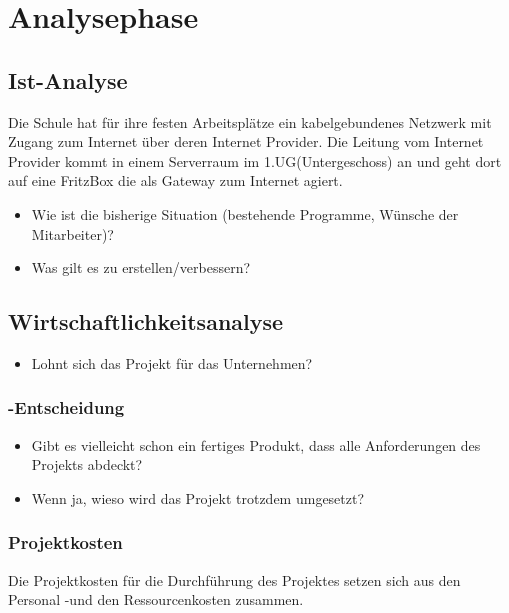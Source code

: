 \section{Analysephase} 
\label{sec:Analysephase}


\subsection{Ist-Analyse} 
\label{sec:IstAnalyse}
Die Schule hat für ihre festen Arbeitsplätze ein kabelgebundenes Netzwerk mit Zugang zum Internet über deren Internet Provider. 
Die Leitung vom Internet Provider kommt in einem Serverraum im 1.UG(Untergeschoss) an und geht dort auf eine FritzBox die als Gateway zum Internet agiert.


\begin{itemize}
	\item Wie ist die bisherige Situation (\zB bestehende Programme, Wünsche der Mitarbeiter)?
	\item Was gilt es zu erstellen/verbessern?
\end{itemize}


\subsection{Wirtschaftlichkeitsanalyse}
\label{sec:Wirtschaftlichkeitsanalyse}
\begin{itemize}
	\item Lohnt sich das Projekt für das Unternehmen?
\end{itemize}


\subsubsection{-Entscheidung}
\label{sec:MakeOrBuyEntscheidung}
\begin{itemize}
	\item Gibt es vielleicht schon ein fertiges Produkt, dass alle Anforderungen des Projekts abdeckt?
	\item Wenn ja, wieso wird das Projekt trotzdem umgesetzt?
\end{itemize}


\subsubsection{Projektkosten}
\label{sec:Projektkosten}
Die Projektkosten für die Durchführung des Projektes setzen sich aus den Personal -und den Ressourcenkosten zusammen.
